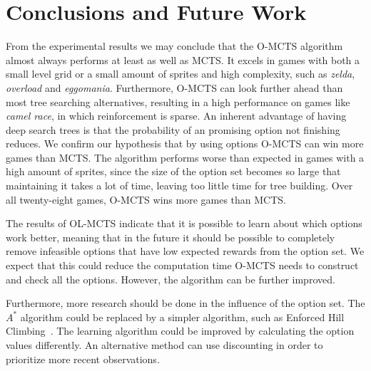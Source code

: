 \section{Conclusions and Future Work}
\label{sec:conclusion}
From the experimental results we may conclude that the O-MCTS algorithm almost
always performs at least as well as MCTS\@. It excels in games with both a small
level grid or a small amount of sprites and high complexity, such as
\textit{zelda}, \textit{overload} and \textit{eggomania}.  Furthermore, O-MCTS
can look further ahead than most tree searching alternatives, resulting in a
high performance on games like \textit{camel race}, in which reinforcement is
sparse. An inherent advantage of having deep search trees is that the
probability of an promising option not finishing reduces. We confirm our
hypothesis that by using options O-MCTS can win more games than MCTS\@. The
algorithm performs worse than expected in games with a high amount of sprites,
since the size of the option set becomes so large that maintaining it takes a
lot of time, leaving too little time for tree building.  Over all twenty-eight
games, O-MCTS wins more games than MCTS\@.

The results of OL-MCTS indicate that it is possible to learn about which options
work better, meaning that in the future it should be possible to completely
remove infeasible options that have low expected rewards from the option set. We
expect that this could reduce the computation time O-MCTS needs to construct and
check all the options. However, the algorithm can be further improved.

Furthermore, more research should be done in the influence of the option set.
The $A^*$ algorithm could be replaced by a simpler algorithm, such as Enforced
Hill Climbing~\cite{ross2014general}.
The learning algorithm could be improved by calculating the option values
differently. An alternative method can use discounting in order to prioritize
more recent observations.
